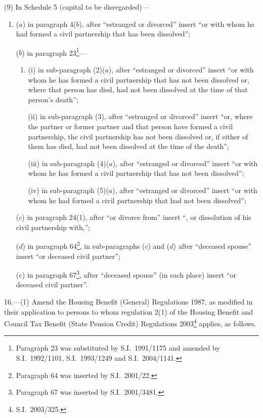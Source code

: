 \documentclass[12pt,a4paper]{article}
\begin{document}
(9) In Schedule 5 (capital to be disregarded)—
\begin{enumerate}\item[]
($a$) in paragraph 4($b$), after “estranged or divorced” insert “or with whom he had formed a civil partnership that has been dissolved”;

($b$) in paragraph 23\footnote{Paragraph 23 was substituted by S.I.\ 1991/1175 and amended by S.I.\ 1992/1101, S.I.\ 1993/1249 and S.I.\ 2004/1141.}—
\begin{enumerate}\item[]
(i) in sub-paragraph (2)($a$), after “estranged or divorced” insert “or with whom he has formed a civil partnership that has not been dissolved or, where that person has died, had not been dissolved at the time of that person’s death”;

(ii) in sub-paragraph (3), after “estranged or divorced” insert “or, where the partner or former partner and that person have formed a civil partnership, the civil partnership has not been dissolved or, if either of them has died, had not been dissolved at the time of the death”;

(iii) in sub-paragraph (4)($a$), after “estranged or divorced” insert “or with whom he has formed a civil partnership that has not been dissolved”;

(iv) in sub-paragraph (5)($a$), after “estranged or divorced” insert “or with whom he had formed a civil partnership that had not been dissolved”;
\end{enumerate}

($c$) in paragraph 24(1), after “or divorce from” insert “, or dissolution of his civil partnership with,”;

($d$) in paragraph 64\footnote{Paragraph 64 was inserted by S.I.\ 2001/22.}, in sub-paragraphs ($c$)  and ($d$)  after “deceased spouse” insert “or deceased civil partner”;

($e$) in paragraph 67\footnote{Paragraph 67 was inserted by S.I.\ 2001/3481.}, after “deceased spouse” (in each place) insert “or deceased civil partner”.
\end{enumerate}

\medskip

16.---(1)  Amend the Housing Benefit (General) Regulations 1987, as modified in their application to persons to whom regulation 2(1) of the Housing Benefit and Council Tax Benefit (State Pension Credit) Regulations 2003\footnote{S.I.\ 2003/325.} applies, as follows.
\end{document}
